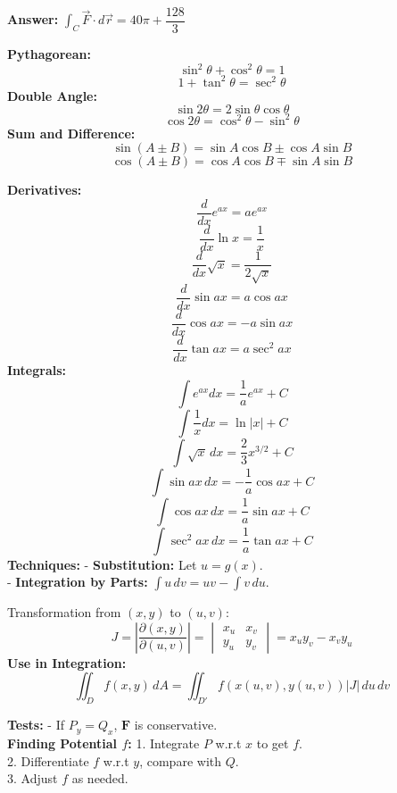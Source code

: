 \documentclass[9pt]{article}
\begin{document}
\begin{multicols}{2}
\begin{tcolorbox}[title=\textbf{Example: Evaluating a Line Integral Using Green's Theorem}, colframe=lightpink]
\textbf{Answer:} \( \int_C \vec{F} \cdot d\vec{r} = 40\pi + \dfrac{128}{3} \)
\end{tcolorbox}

\begin{tcolorbox}[title=\textbf{Trigonometric Identities}, colframe=lightpink]
\textbf{Pythagorean:}
\[ \sin^2 \theta + \cos^2 \theta = 1 \]
\[ 1 + \tan^2 \theta = \sec^2 \theta \]
\textbf{Double Angle:}
\[ \sin 2\theta = 2 \sin \theta \cos \theta \]
\[ \cos 2\theta = \cos^2 \theta - \sin^2 \theta \]
\textbf{Sum and Difference:}
\[ \sin (A \pm B) = \sin A \cos B \pm \cos A \sin B \]
\[ \cos (A \pm B) = \cos A \cos B \mp \sin A \sin B \]
\end{tcolorbox}

\begin{tcolorbox}[title=\textbf{Common Derivatives and Integrals}, colframe=lightyellow]
\textbf{Derivatives:}
\[ \frac{d}{dx} e^{ax} = a e^{ax} \]
\[ \frac{d}{dx} \ln x = \frac{1}{x} \]
\[ \frac{d}{dx} \sqrt{x} = \frac{1}{2 \sqrt{x}} \]
\[ \frac{d}{dx} \sin ax = a \cos ax \]
\[ \frac{d}{dx} \cos ax = -a \sin ax \]
\[ \frac{d}{dx} \tan ax = a \sec^2 ax \]
\textbf{Integrals:}
\[ \int e^{ax} dx = \frac{1}{a} e^{ax} + C \]
\[ \int \frac{1}{x} dx = \ln |x| + C \]
\[ \int \sqrt{x}\, dx = \frac{2}{3} x^{3/2} + C \]
\[ \int \sin ax\, dx = -\frac{1}{a} \cos ax + C \]
\[ \int \cos ax\, dx = \frac{1}{a} \sin ax + C \]
\[ \int \sec^2 ax\, dx = \frac{1}{a} \tan ax + C \]
\textbf{Techniques:}
- \textbf{Substitution:} Let \( u = g(x) \). \\
- \textbf{Integration by Parts:} \( \int u\, dv = uv - \int v\, du \).
\end{tcolorbox}

\begin{tcolorbox}[title=\textbf{Jacobian Determinant}, colframe=lightgreen]
Transformation from \( (x, y) \) to \( (u, v) \):
\[ J = \left| \frac{\partial(x, y)}{\partial(u, v)} \right| = 
\begin{vmatrix}
x_u & x_v \\
y_u & y_v
\end{vmatrix}
= x_u y_v - x_v y_u \]
\textbf{Use in Integration:}
\[ \iint_D f(x, y)\, dA = \iint_{D'} f(x(u, v), y(u, v)) |J|\, du\, dv \]
\end{tcolorbox}

\begin{tcolorbox}[title=\textbf{Conservative Vector Fields}, colframe=lightblue]
\textbf{Tests:}
- If \( P_y = Q_x \), \( \mathbf{F} \) is conservative. \\
\textbf{Finding Potential \( f \):}
1. Integrate \( P \) w.r.t \( x \) to get \( f \). \\
2. Differentiate \( f \) w.r.t \( y \), compare with \( Q \). \\
3. Adjust \( f \) as needed.
\end{tcolorbox}


\end{multicols}
\end{document}
